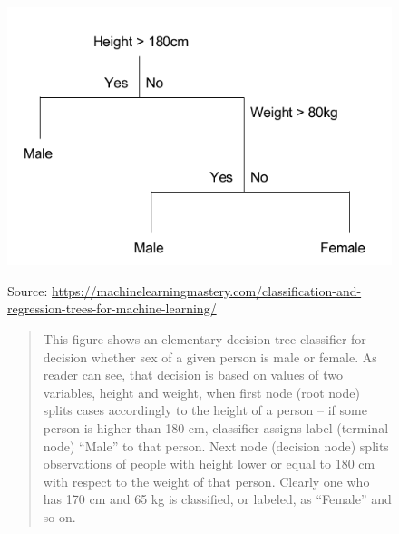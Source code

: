 \documentclass[12pt, twoside]{book} %
\begin{document}
\begin{figure}[H]
\includegraphics[width=\textwidth]{decisiontree.png}
\label{Figure 1.1}
{\small Source: \url{https://machinelearningmastery.com/classification-and-regression-trees-for-machine-learning/} \newline
\begin{quotation}
This figure shows an elementary decision tree classifier for decision whether sex of a given person is male or female. As reader can see, that decision is based on values of two variables, height and weight, when first node (root node) splits cases accordingly to the height of a person – if some person is higher than 180 cm, classifier assigns label (terminal node) “Male” to that person. Next node (decision node) splits observations of people with height lower or equal to 180 cm with respect to the weight of that person. Clearly one who has 170 cm and 65 kg is classified, or labeled, as “Female” and so on.
\end{quotation}
}
\end{figure}
\end{document}
